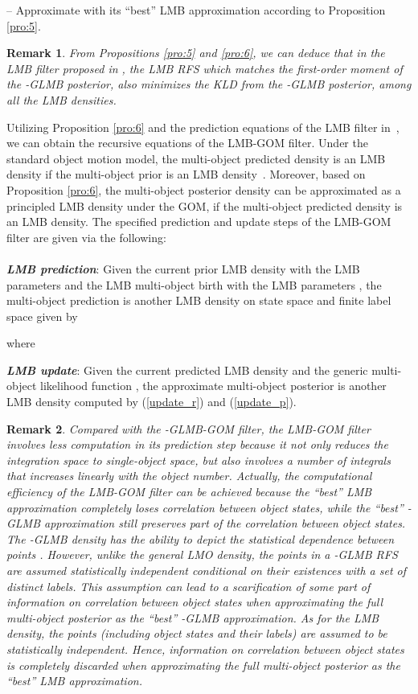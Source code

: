 \documentclass[journal]{IEEEtran}
\newtheorem{Rem}{Remark}
\begin{document}
{\noindent-- Approximate   with its ``best'' LMB approximation  according to Proposition \ref{pro:5}.
\begin{Rem}\label{remark:4}
From Propositions \ref{pro:5} and \ref{pro:6}, we can deduce that in the LMB filter proposed in \cite{refr:label_5}, the LMB RFS which matches the first-order moment of the -GLMB posterior, also minimizes the KLD from the -GLMB posterior, among all the LMB densities.
\end{Rem}


Utilizing Proposition \ref{pro:6} and the prediction equations of the LMB filter in~\cite{refr:label_5}, we   can obtain the recursive equations of the LMB-GOM filter. 
Under the standard object motion model, the  multi-object predicted density 
 is  an LMB density if the multi-object prior is an LMB density~\cite{refr:label_5}. Moreover, based on  Proposition \ref{pro:6}, the  multi-object posterior
density  can  be approximated as a principled LMB density under the GOM, if the  multi-object predicted density  is an LMB density. The specified  prediction  and update steps of the LMB-GOM filter are given via the following:
\\
\\
\textit{\textbf{LMB prediction}}: Given the current prior LMB density with the LMB parameters  and the LMB multi-object birth with the LMB parameters  ,  the multi-object prediction is  another LMB density on state space  and finite label space  given by 
 
 where
 
\textit{\textbf{LMB update}}: Given the current predicted LMB density
 and 
  the generic multi-object likelihood function , the  approximate multi-object  posterior   is another LMB density     computed by  (\ref{update_r}) and (\ref{update_p}).
\begin{Rem}\label{remark:5}
Compared with the -GLMB-GOM filter, the LMB-GOM filter involves  less computation in its prediction step because it not only reduces the integration space to single-object space, but also involves a number of integrals that increases linearly with the object number.  Actually, the computational efficiency of the LMB-GOM filter can be achieved because  the ``best'' LMB approximation completely loses correlation between object states,  while  the ``best''  -GLMB approximation still preserves part of the correlation between object states.  The -GLMB density has the ability to depict the statistical dependence between points \cite{refr:label_6}. However, unlike the general LMO density,  the points in a -GLMB RFS are assumed statistically independent conditional on their existences with a set of distinct labels. This  assumption can lead to a scarification of some part of information on correlation between object states when approximating the full multi-object posterior as the ``best'' -GLMB  approximation. As for the LMB density, the points (including object states and their labels) are  assumed to be statistically independent.  Hence, information on correlation between object states is completely discarded when approximating the full multi-object posterior as the ``best'' LMB approximation. 
\end{Rem}
}
\end{document}
